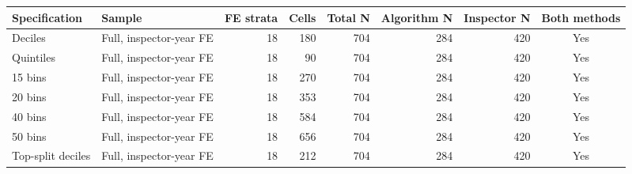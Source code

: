 \begin{tabular}{llrrrrrc}
\toprule
Specification & Sample & FE strata & Cells & Total N & Algorithm N & Inspector N & Both methods \\
\midrule
Deciles & Full, inspector-year FE & 18 & 180 & 704 & 284 & 420 & Yes \\
Quintiles & Full, inspector-year FE & 18 & 90 & 704 & 284 & 420 & Yes \\
15 bins & Full, inspector-year FE & 18 & 270 & 704 & 284 & 420 & Yes \\
20 bins & Full, inspector-year FE & 18 & 353 & 704 & 284 & 420 & Yes \\
40 bins & Full, inspector-year FE & 18 & 584 & 704 & 284 & 420 & Yes \\
50 bins & Full, inspector-year FE & 18 & 656 & 704 & 284 & 420 & Yes \\
Top-split deciles & Full, inspector-year FE & 18 & 212 & 704 & 284 & 420 & Yes \\
\bottomrule
\end{tabular}
